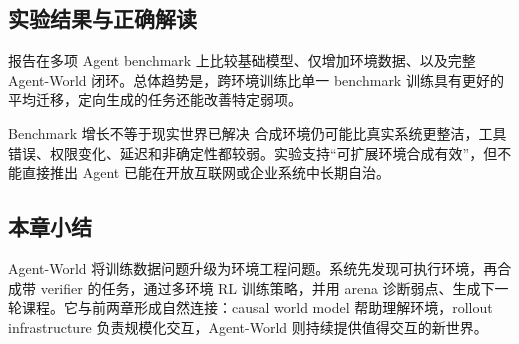 \subsection{实验结果与正确解读}

报告在多项 Agent benchmark 上比较基础模型、仅增加环境数据、以及完整 Agent-World 闭环。总体趋势是，跨环境训练比单一 benchmark 训练具有更好的平均迁移，定向生成的任务还能改善特定弱项。




\begin{warningbox}{Benchmark 增长不等于现实世界已解决}
合成环境仍可能比真实系统更整洁，工具错误、权限变化、延迟和非确定性都较弱。实验支持“可扩展环境合成有效”，但不能直接推出 Agent 已能在开放互联网或企业系统中长期自治。
\end{warningbox}

\subsection{本章小结}

Agent-World 将训练数据问题升级为环境工程问题。系统先发现可执行环境，再合成带 verifier 的任务，通过多环境 RL 训练策略，并用 arena 诊断弱点、生成下一轮课程。它与前两章形成自然连接：causal world model 帮助理解环境，rollout infrastructure 负责规模化交互，Agent-World 则持续提供值得交互的新世界。
